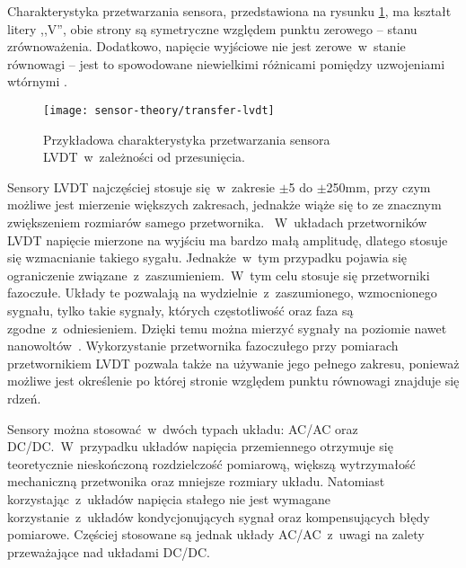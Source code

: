 Charakterystyka przetwarzania sensora, przedstawiona na rysunku \ref{img:transfer-lvdt}, ma kształt
litery ,,V'', obie strony są symetryczne względem punktu zerowego -- stanu zrównoważenia. Dodatkowo,
napięcie wyjściowe nie jest zerowe~w~stanie równowagi -- jest to spowodowane niewielkimi różnicami
pomiędzy uzwojeniami wtórnymi \cite{sensory_wykład}.

\begin{figure}[!htbp]
  \centering
  \texttt{[image: sensor-theory/transfer-lvdt]}
  \caption{\label{img:transfer-lvdt}Przykładowa charakterystyka przetwarzania sensora
    LVDT~w~zależności od przesunięcia.}
\end{figure}

Sensory LVDT najczęściej stosuje się~w~zakresie $\pm$5 do $\pm$250mm, przy czym możliwe jest
mierzenie większych zakresach, jednakże wiąże się to ze znacznym zwiększeniem rozmiarów samego
przetwornika. ~W~układach przetworników LVDT napięcie mierzone na wyjściu ma bardzo małą amplitudę,
dlatego stosuje się wzmacnianie takiego sygału. Jednakże~w~tym przypadku pojawia się ograniczenie
związane~z~zaszumieniem.~W~tym celu stosuje się przetworniki fazoczułe. Układy te pozwalają na
wydzielnie~z~zaszumionego, wzmocnionego sygnału, tylko takie sygnały, których częstotliwość oraz
faza są zgodne~z~odniesieniem. Dzięki temu można mierzyć sygnały na poziomie nawet
nanowoltów~\cite{tumanski2007}. Wykorzystanie przetwornika fazoczułego przy pomiarach przetwornikiem
LVDT pozwala także na używanie jego pełnego zakresu, ponieważ możliwe jest określenie po której
stronie względem punktu równowagi znajduje się rdzeń.

Sensory można stosować~w~dwóch typach układu: AC/AC oraz DC/DC.~W~przypadku układów
napięcia przemiennego otrzymuje się teoretycznie nieskończoną rozdzielczość pomiarową, większą
wytrzymałość mechaniczną przetwonika oraz mniejsze rozmiary układu. Natomiast korzystając~z~układów
napięcia stałego nie jest wymagane korzystanie~z~układów kondycjonujących sygnał oraz kompensujących
błędy pomiarowe. Częściej stosowane są jednak układy AC/AC~z~uwagi na zalety przeważające nad
układami DC/DC.
